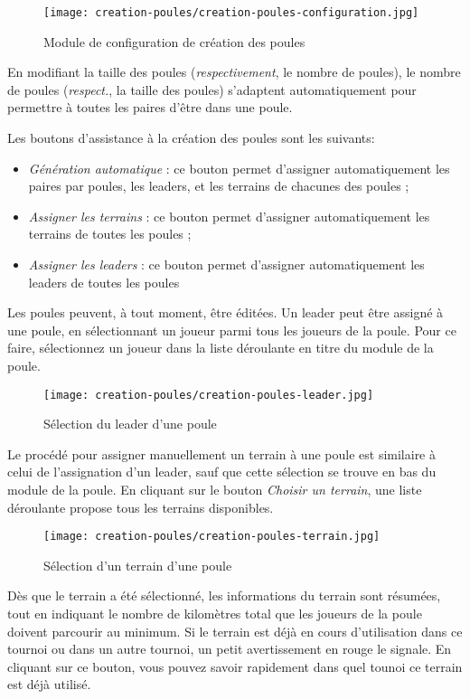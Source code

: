 \begin{figure}[H]
\centering
\texttt{[image: creation-poules/creation-poules-configuration.jpg]}
\caption{Module de configuration de création des poules}
\end{figure}

En modifiant la taille des poules (\textit{respectivement}, le nombre de poules), le nombre de poules (\textit{respect.}, la taille des poules) s'adaptent automatiquement pour permettre à toutes les paires d'être dans une poule.\newline

Les boutons d'assistance à la création des poules sont les suivants:

\begin{itemize}
\item \textit{Génération automatique} : ce bouton permet d'assigner automatiquement les paires par poules, les leaders, et les terrains de chacunes des poules ;
\item \textit{Assigner les terrains} : ce bouton permet d'assigner automatiquement les terrains de toutes les poules ;
\item \textit{Assigner les leaders} : ce bouton permet d'assigner automatiquement les leaders de toutes les poules
\end{itemize}
\bigskip

Les poules peuvent, à tout moment, être éditées. Un leader peut être assigné à une poule, en sélectionnant un joueur parmi tous les joueurs de la poule. Pour ce faire, sélectionnez un joueur dans la liste déroulante en titre du module de la poule.

\begin{figure}[H]
\centering
\texttt{[image: creation-poules/creation-poules-leader.jpg]}
\caption{Sélection du leader d'une poule}
\end{figure}

Le procédé pour assigner manuellement un terrain à une poule est similaire à celui de l'assignation d'un leader, sauf que cette sélection se trouve en bas du module de la poule. En cliquant sur le bouton \textit{Choisir un terrain}, une liste déroulante propose tous les terrains disponibles.

\begin{figure}[H]
\centering
\texttt{[image: creation-poules/creation-poules-terrain.jpg]}
\caption{Sélection d'un terrain d'une poule}
\end{figure}

Dès que le terrain a été sélectionné, les informations du terrain sont résumées, tout en indiquant le nombre de kilomètres total que les joueurs de la poule doivent parcourir au minimum. Si le terrain est déjà en cours d'utilisation dans ce tournoi ou dans un autre tournoi, un petit avertissement en rouge le signale. En cliquant sur ce bouton, vous pouvez savoir rapidement dans quel tounoi ce terrain est déjà utilisé.


